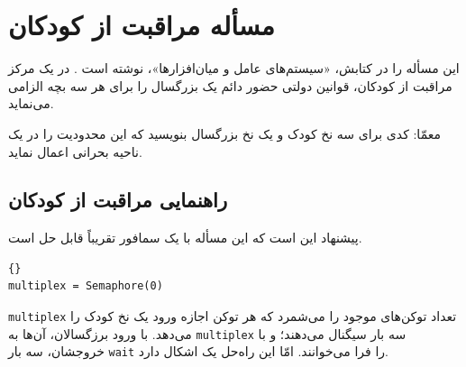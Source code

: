 \documentclass{book}
\newcommand{\clearemptydoublepage}{\newpage\cleardoublepage}
\begin{document}
\section{مسأله مراقبت از کودکان}

    این مسأله را  در کتابش، «سیستم‌های عامل و میان‌افزارها»، نوشته است \cite{hailperin}. 
    در یک مرکز مراقبت از کودکان، قوانین دولتی حضور دائم یک بزرگسال را برای هر سه بچه الزامی می‌نماید. 

    معمّا: کدی برای سه نخ کودک و یک نخ بزرگسال بنویسید که این محدودیت‌ را در یک ناحیه بحرانی اعمال نماید. 

\clearemptydoublepage
\subsection {راهنمایی مراقبت از کودکان}

    پیشنهاد  این است که این مسأله با یک سمافور تقریباً قابل حل است. 

\begin{latin}
\begin{lstlisting}[title=\rl{راهنمایی مراقبت از کودکان}]{}
multiplex = Semaphore(0)
\end{lstlisting}
\end{latin}

    {\tt multiplex} 
    تعداد توکن‌های موجود را می‌شمرد که هر توکن اجازه ورود یک نخ کودک را می‌دهد. 
    با ورود برزگسالان، آن‌ها به {\tt multiplex} سه بار سیگنال می‌دهند؛ و با خروجشان، سه بار {\tt wait} را فرا می‌خوانند. 
    امّا این راه‌حل یک اشکال دارد. 
\end{document}
